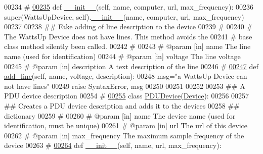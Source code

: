 \begin{DoxyCode}
00234     \textcolor{comment}{#}
\hypertarget{settings__classes_8py_source_l00235}{}\hyperlink{classsettings__classes_1_1_watts_up_device_ac775ee34451fdfa742b318538164070e}{00235}     \textcolor{keyword}{def }\hyperlink{classsettings__classes_1_1_watts_up_device_ac775ee34451fdfa742b318538164070e}{__init__}(self, name, computer, url, max\_frequency):
00236         super(WattsUpDevice, self).\hyperlink{classsettings__classes_1_1_watts_up_device_ac775ee34451fdfa742b318538164070e}{__init__}(name, computer, url, max\_frequency)
00237 
00238     \textcolor{comment}{## Fake adding of line description to the device}
00239     \textcolor{comment}{#}
00240     \textcolor{comment}{#  The WattsUp Device does not have lines. This method avoids the}
00241     \textcolor{comment}{#  base class method silently been called.}
00242     \textcolor{comment}{#}
00243     \textcolor{comment}{# @param [in] name        The line name (used for identification)}
00244     \textcolor{comment}{# @param [in] voltage     The line voltage}
00245     \textcolor{comment}{# @param [in] description A text description of the line}
00246     \textcolor{comment}{#}
\hypertarget{settings__classes_8py_source_l00247}{}\hyperlink{classsettings__classes_1_1_watts_up_device_a9b24e7f6a176430603b1aec4ead55473}{00247}     \textcolor{keyword}{def }\hyperlink{classsettings__classes_1_1_watts_up_device_a9b24e7f6a176430603b1aec4ead55473}{add_line}(self, name, voltage, description):
00248         msg=\textcolor{stringliteral}{"a WattsUp Device can not have lines"}
00249         \textcolor{keywordflow}{raise} SyntaxError, msg
00250 
00251 
00252 
00253 \textcolor{comment}{## A PDU device description}
00254 \textcolor{comment}{#}
\hypertarget{settings__classes_8py_source_l00255}{}\hyperlink{classsettings__classes_1_1_p_d_u_device}{00255} \textcolor{keyword}{class }\hyperlink{classsettings__classes_1_1_p_d_u_device}{PDUDevice}(\hyperlink{classsettings__classes_1_1_device}{Device}):
00256     
00257     \textcolor{comment}{## Creates a PDU device description and adds it to the devices}
00258     \textcolor{comment}{## dictionary}
00259     \textcolor{comment}{#}
00260     \textcolor{comment}{# @param [in] name           The device name (used for identification, must
       be unique)}
00261     \textcolor{comment}{# @param [in] url            The url of this device}
00262     \textcolor{comment}{# @param [in] max\_frequency  The maximum sample frequency of the device}
00263     \textcolor{comment}{#}
\hypertarget{settings__classes_8py_source_l00264}{}\hyperlink{classsettings__classes_1_1_p_d_u_device_ac775ee34451fdfa742b318538164070e}{00264}     \textcolor{keyword}{def }\hyperlink{classsettings__classes_1_1_p_d_u_device_ac775ee34451fdfa742b318538164070e}{__init__}(self, name, url, max\_frequency):

\end{DoxyCode}
